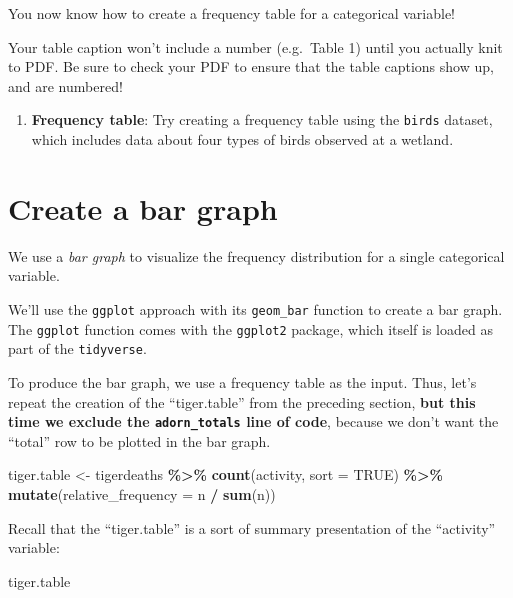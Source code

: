 \documentclass[
]{book}
\newenvironment{Shaded}{\begin{snugshade}}{\end{snugshade}}
\newcommand{\AttributeTok}[1]{\textcolor[rgb]{0.13,0.29,0.53}{#1}}
\newcommand{\ConstantTok}[1]{\textcolor[rgb]{0.56,0.35,0.01}{#1}}
\newcommand{\FunctionTok}[1]{\textcolor[rgb]{0.13,0.29,0.53}{\textbf{#1}}}
\newcommand{\NormalTok}[1]{#1}
\newcommand{\OtherTok}[1]{\textcolor[rgb]{0.56,0.35,0.01}{#1}}
\newcommand{\SpecialCharTok}[1]{\textcolor[rgb]{0.81,0.36,0.00}{\textbf{#1}}}
\providecommand{\tightlist}{%
  \setlength{\itemsep}{0pt}\setlength{\parskip}{0pt}}
\begin{document}
You now know how to create a frequency table for a categorical variable!

Your table caption won't include a number (e.g.~Table 1) until you actually knit to PDF. Be sure to check your PDF to ensure that the table captions show up, and are numbered!

\begin{enumerate}
\def\labelenumi{\arabic{enumi}.}
\setcounter{enumi}{1}
\tightlist
\item
  \textbf{Frequency table}: Try creating a frequency table using the \texttt{birds} dataset, which includes data about four types of birds observed at a wetland.
\end{enumerate}

\section{Create a bar graph}\label{vis_cat_barchart}

We use a \emph{bar graph} to visualize the frequency distribution for a single categorical variable.

We'll use the \texttt{ggplot} approach with its \texttt{geom\_bar} function to create a bar graph. The \texttt{ggplot} function comes with the \texttt{ggplot2} package, which itself is loaded as part of the \texttt{tidyverse}.

To produce the bar graph, we use a frequency table as the input. Thus, let's repeat the creation of the ``tiger.table'' from the preceding section, \textbf{but this time we exclude the \texttt{adorn\_totals} line of code}, because we don't want the ``total'' row to be plotted in the bar graph.

\begin{Shaded}
\begin{Highlighting}[]
\NormalTok{tiger.table }\OtherTok{\textless{}{-}}\NormalTok{ tigerdeaths }\SpecialCharTok{\%\textgreater{}\%}
  \FunctionTok{count}\NormalTok{(activity, }\AttributeTok{sort =} \ConstantTok{TRUE}\NormalTok{) }\SpecialCharTok{\%\textgreater{}\%} 
  \FunctionTok{mutate}\NormalTok{(}\AttributeTok{relative\_frequency =}\NormalTok{ n }\SpecialCharTok{/} \FunctionTok{sum}\NormalTok{(n))}
\end{Highlighting}
\end{Shaded}

Recall that the ``tiger.table'' is a sort of summary presentation of the ``activity'' variable:

\begin{Shaded}
\begin{Highlighting}[]
\NormalTok{tiger.table}
\end{Highlighting}
\end{Shaded}
\end{document}
